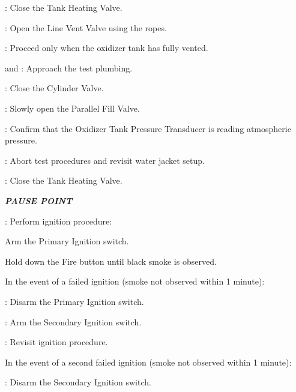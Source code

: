 \begin{checklist}
\begin{checklist}[label=$\bullet$]
        \begin{checklist}
            \item \heat: Close the Tank Heating Valve.
            \item \primary{}: Open the Line Vent Valve using the ropes.
            \item \secondary: Proceed only when the oxidizer tank has fully vented.
            \item \primary{} and \secondary: Approach the test plumbing.
            \item \primary{}: Close the Cylinder Valve.
            \item \primary{}: Slowly open the Parallel Fill Valve.
            \item \daq{}: Confirm that the Oxidizer Tank Pressure Transducer is reading atmospheric pressure.
            \item \ops{}: Abort test procedures and revisit water jacket setup.
        \end{checklist}
    \end{checklist}
    \item \heat: Close the Tank Heating Valve.
    \item \textbf{\textit{PAUSE POINT}}
    \item \primary{}: Perform ignition procedure:
    \begin{checklist}
        \item Arm the Primary Ignition switch.
        \item Hold down the Fire button until black smoke is observed.
        \begin{checklist}[label=$\bullet$]
            \item In the event of a failed ignition (smoke not observed within 1 minute):
            \begin{checklist}
                \item \primary: Disarm the Primary Ignition switch.
                \item \primary: Arm the Secondary Ignition switch.
                \item \ops: Revisit ignition procedure.
            \end{checklist}
            \item In the event of a second failed ignition (smoke not observed within 1 minute):
            \begin{checklist}
                \item \primary: Disarm the Secondary Ignition switch.

\end{checklist}
\end{checklist}
\end{checklist}
\end{checklist}
